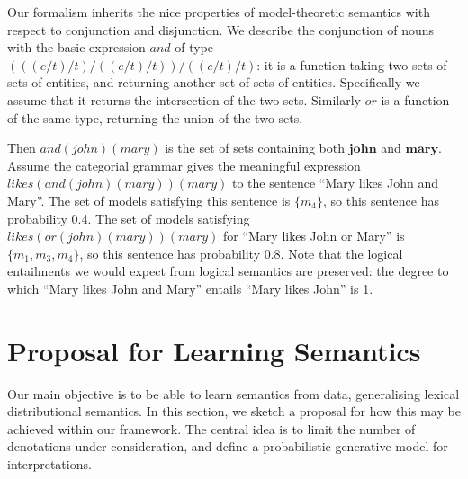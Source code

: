 \documentclass[letterpaper]{article}
\newcommand{\citet}[1]{\newcite{#1}}
\begin{document}
Our formalism inherits the nice properties of model-theoretic
semantics with respect to conjunction and disjunction. We describe the
conjunction of nouns with the basic expression $\mathit{and}$ of type
$(((e/t)/t)/((e/t)/t))/((e/t)/t)$: it is a function taking two sets of
sets of entities, and returning another set of sets of
entities. Specifically we assume that it returns the intersection of
the two sets. Similarly $\mathit{or}$ is a function of the same type,
returning the union of the two sets.

Then $\mathit{and}(john)(mary)$ is the set of sets containing both
$\mathbf{john}$ and $\mathbf{mary}$. Assume the categorial grammar
gives the meaningful expression
$\mathit{likes}(\mathit{and}(\mathit{john})(\mathit{mary}))(\mathit{mary})$
to the sentence ``Mary likes John and Mary''. The set of models
satisfying this sentence is $\{m_4\}$, so this sentence has
probability 0.4. The set of models satisfying
$\mathit{likes}(\mathit{or}(\mathit{john})(\mathit{mary}))(\mathit{mary})$
for ``Mary likes John or Mary'' is $\{m_1, m_3, m_4\}$, so this
sentence has probability 0.8. Note that the logical entailments we
would expect from logical semantics are preserved: the degree to which
``Mary likes John and Mary'' entails ``Mary likes John'' is 1.



\section{Proposal for Learning Semantics}
\label{section:distributions}

Our main objective is to be able to learn semantics from data,
generalising lexical distributional semantics. In this section, we
sketch a proposal for how this may be achieved within our
framework. The central idea is to limit the number of denotations
under consideration, and define a probabilistic generative model for
interpretations.
\end{document}
